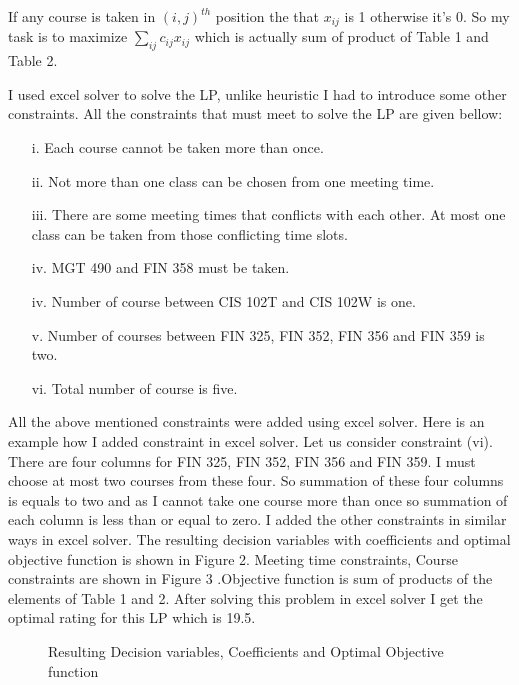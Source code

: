 \documentclass[paper=letter, fontsize=11pt]{scrartcl} %
\begin{document}
If any course is taken in $(i,j)^{th}$ position the that  $x_{ij}$ is 1 otherwise it's 0. So my task is to maximize $\sum\limits_{ij} c_{ij}x_{ij}$ which is actually sum of product of Table 1 and Table 2.

I used excel solver to solve the LP, unlike heuristic I had to introduce some other constraints. All the constraints that must meet to solve the LP are given bellow:

\begin{enumerate}[align=left,style=nextline,leftmargin=1.5cm,labelsep=\parindent,font=\normalfont]
\item[i.]  Each course cannot be taken more than once.
\item[ii.] Not more than one class can be chosen from one meeting time.
\item[iii.] There are some meeting times that conflicts with each other. At most one class can be taken from those conflicting time slots.  
\item[iv.] MGT 490 and FIN 358 must be taken.
\item[iv.] Number of course between CIS 102T and CIS 102W is one.
\item[v.] Number of courses between FIN 325, FIN 352, FIN 356 and FIN 359 is two.
\item[vi.] Total number of course is five.
\end{enumerate}  

All the above mentioned constraints were added using excel solver. Here is an example how I added constraint in excel solver. Let us consider constraint (vi). There are four columns for FIN 325, FIN 352, FIN 356 and FIN 359. I must choose at most two courses from these four. So summation of these four columns is equals to two and as I cannot take one course more than once so summation of each column is less than or equal to zero. I added the other constraints in similar ways in excel solver.  The resulting decision variables with coefficients and optimal objective function is shown in Figure 2. Meeting time constraints, Course constraints are shown in Figure 3 .Objective function is sum of products of the elements of Table 1 and 2. After solving this problem in excel solver I get the optimal rating for this LP which is 19.5.         
\begin{figure}[H]
  
  \centering
    \caption{Resulting Decision variables, Coefficients and Optimal Objective function}
\end{figure}
\end{document}
